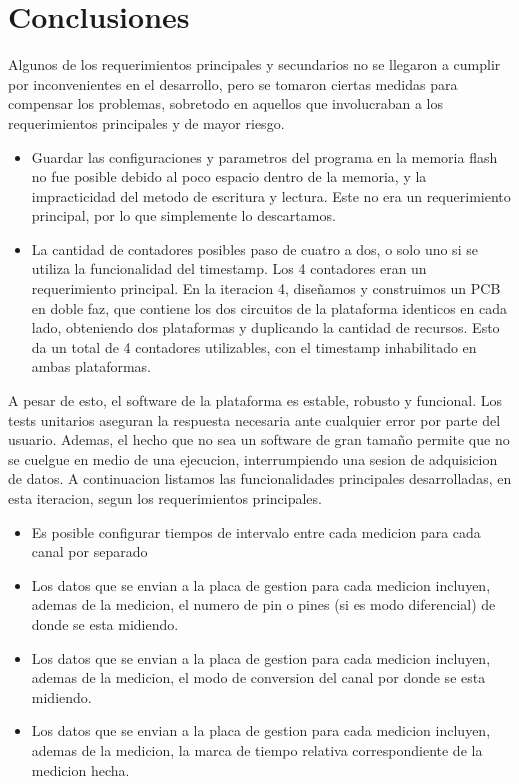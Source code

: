 
\section{Conclusiones} %
\label{sec:conclusiones}

Algunos de los requerimientos principales y secundarios no se llegaron a cumplir por inconvenientes en el desarrollo, pero se tomaron ciertas medidas para compensar los problemas, sobretodo en aquellos que involucraban a los requerimientos principales y de mayor riesgo.

\begin{itemize}
\item Guardar las configuraciones y parametros del programa en la memoria flash no fue posible debido al poco espacio dentro de la memoria, y la impracticidad del metodo de escritura y lectura. Este no era un requerimiento principal, por lo que simplemente lo descartamos.
\item La cantidad de contadores posibles paso de cuatro a dos, o solo uno si se utiliza la funcionalidad del timestamp. Los 4 contadores eran un requerimiento principal. En la iteracion 4, diseñamos y construimos un PCB en doble faz, que contiene los dos circuitos de la plataforma identicos en cada lado, obteniendo dos plataformas y duplicando la cantidad de recursos. Esto da un total de 4 contadores utilizables, con el timestamp inhabilitado en ambas plataformas. 
\end{itemize}

A pesar de esto, el software de la plataforma es estable, robusto y funcional. Los tests unitarios aseguran la respuesta necesaria ante cualquier error por parte del usuario. Ademas, el hecho que no sea un software de gran tamaño permite que no se cuelgue en medio de una ejecucion, interrumpiendo una sesion de adquisicion de datos. A continuacion listamos las funcionalidades principales desarrolladas, en esta iteracion, segun los requerimientos principales.

\begin{itemize}
\item Es posible configurar tiempos de intervalo entre cada medicion para cada canal por separado
\item Los datos que se envian a la placa de gestion para cada medicion incluyen, ademas de la medicion, el numero de pin o pines (si es modo diferencial) de donde se esta midiendo. 
\item Los datos que se envian a la placa de gestion para cada medicion incluyen, ademas de la medicion, el modo de conversion del canal por donde se esta midiendo.
\item Los datos que se envian a la placa de gestion para cada medicion incluyen, ademas de la medicion, la marca de tiempo relativa correspondiente de la medicion hecha. 
\end{itemize}


